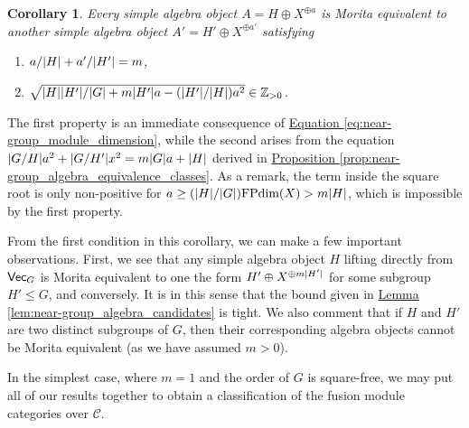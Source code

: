 \documentclass[12pt, reqno]{amsart}
\numberwithin{equation}{section}
\theoremstyle{plainspace}
\newtheorem{corollary}[theorem]{Corollary}
\theoremstyle{definitionspace}
\theoremstyle{remarkspace}
\renewenvironment{proof}{{\noindent\textbf{Proof.}}}{\null\hfill\qedsymbol}
\DeclarePairedDelimiter{\abs}{\lvert}{\rvert}
\newcommand{\mathcat}[1]{\mathcal{#1}}
\newcommand{\textcat}[1]{\textup{\textsf{#1}}}
\newcommand{\FPdim}{\textup{FPdim}}
\begin{document}
\begin{corollary}\label{cor:near-group_algebra_properties}
Every simple algebra object $A = H \oplus X^{\oplus a}$ is Morita equivalent to another simple algebra object $A' = H' \oplus X^{\oplus a'}$ satisfying
\begin{enumerate}[start=1, leftmargin=1.5cm, label={(\arabic*).}]
\item $a/\abs{H} + a'/\abs{H'} = m$,
\item $\sqrt{\abs{H}\abs{H'}/\abs{G} + m\abs{H'}a - (\abs{H'}/\abs{H})a^2} \in \mathbb{Z}_{>0}$.
\end{enumerate}
\end{corollary}
\leavevmode\newline
\begin{proof}
\noindent The first property is an immediate consequence of \hyperref[eq:near-group_module_dimension]{Equation \ref*{eq:near-group_module_dimension}}, while the second arises from the equation $\abs{G/H}a^2 + \abs{G/H'}x^2 = m\abs{G}a + \abs{H}$ derived in \hyperref[prop:near-group_algebra_equivalence_classes]{Proposition \ref*{prop:near-group_algebra_equivalence_classes}}. As a remark, the term inside the square root is only non-positive for $a \geq (\abs{H}/\abs{G})\FPdim(X) > m\abs{H}$, which is impossible by the first property.
\end{proof}
\newline

\noindent From the first condition in this corollary, we can make a few important observations. First, we see that any simple algebra object $H$ lifting directly from $\textcat{Vec}_G$ is Morita equivalent to one the form $H' \oplus X^{\oplus m\abs{H'}}$ for some subgroup $H' \leq G$, and conversely. It is in this sense that the bound given in \hyperref[lem:near-group_algebra_candidates]{Lemma \ref*{lem:near-group_algebra_candidates}} is tight. We also comment that if $H$ and $H'$ are two distinct subgroups of $G$, then their corresponding algebra objects cannot be Morita equivalent (as we have assumed $m > 0$).
\newline

\noindent In the simplest case, where $m = 1$ and the order of $G$ is square-free, we may put all of our results together to obtain a classification of the fusion module categories over $\mathcat{C}$.
\newline
\end{document}
